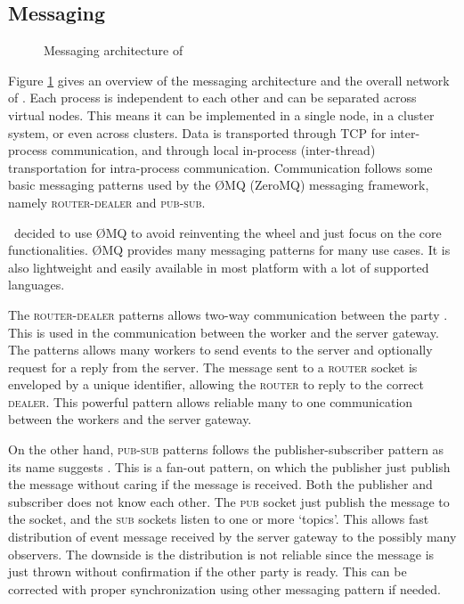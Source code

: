 \subsection{Messaging}
\label{sec:impl.messaging}

\begin{figure}
    \caption{Messaging architecture of \OurBenchmarkingTool}
    \label{fig:zmq}
\end{figure}

Figure \ref{fig:zmq} gives an overview of the messaging architecture and the overall network of \OurBenchmarkingTool.
Each process is independent to each other and can be separated across virtual nodes.
This means it can be implemented in a single node, in a cluster system, or even across clusters.
Data is transported through TCP for inter-process communication, and through local in-process (inter-thread) transportation for intra-process communication.
Communication follows some basic messaging patterns used by the \O MQ (ZeroMQ) messaging framework, namely \textsc{router-dealer} and \textsc{pub-sub}.

\First~decided to use \O MQ to avoid reinventing the wheel and just focus on the core functionalities.
\O MQ provides many messaging patterns for many use cases.
It is also lightweight and easily available in most platform with a lot of supported languages.

The \textsc{router-dealer} patterns allows two-way communication between the party \citep{hintjens2013zeromq}.
This is used in the communication between the worker and the server gateway.
The patterns allows many workers to send events to the server and optionally request for a reply from the server.
The message sent to a \textsc{router} socket is enveloped by a unique identifier, allowing the \textsc{router} to reply to the correct \textsc{dealer}.
This powerful pattern allows reliable many to one communication between the workers and the server gateway.

On the other hand, \textsc{pub-sub} patterns follows the publisher-subscriber pattern as its name suggests \citep{hintjens2013zeromq}.
This is a fan-out pattern, on which the publisher just publish the message without caring if the message is received.
Both the publisher and subscriber does not know each other.
The \textsc{pub} socket just publish the message to the socket, and the \textsc{sub} sockets listen to one or more `topics'.
This allows fast distribution of event message received by the server gateway to the possibly many observers.
The downside is the distribution is not reliable since the message is just thrown without confirmation if the other party is ready.
This can be corrected with proper synchronization using other messaging pattern if needed.


